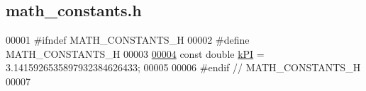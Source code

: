 \hypertarget{math__constants_8h_source}{}\subsection{math\+\_\+constants.\+h}
\label{math__constants_8h_source}

\begin{DoxyCode}
00001 \textcolor{preprocessor}{#ifndef MATH\_CONSTANTS\_H}
00002 \textcolor{preprocessor}{#define MATH\_CONSTANTS\_H}
00003 
\hypertarget{math__constants_8h_source_l00004}{}\hyperlink{math__constants_8h_a368d99984512d9a6c6f18b37b4446431}{00004} \textcolor{keyword}{const} \textcolor{keywordtype}{double} \hyperlink{math__constants_8h_a368d99984512d9a6c6f18b37b4446431}{kPI} = 3.1415926535897932384626433;
00005 
00006 \textcolor{preprocessor}{#endif // MATH\_CONSTANTS\_H}
00007 
\end{DoxyCode}
